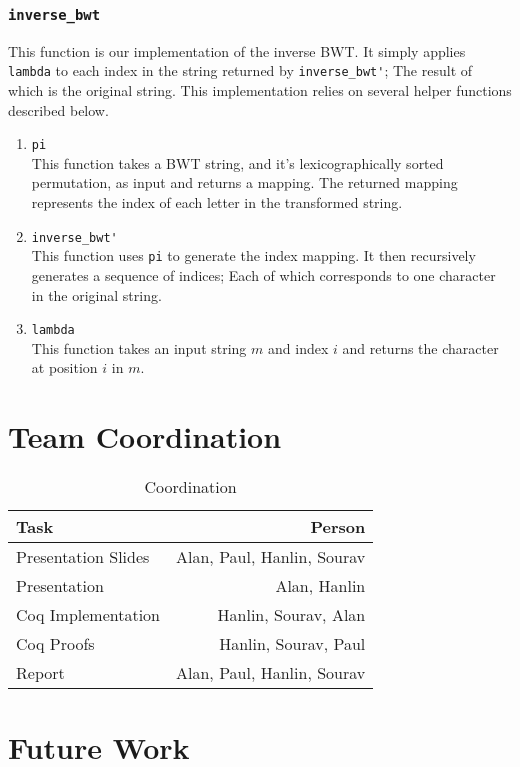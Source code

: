 \documentclass[11pt,letterpaper,]{article}
\begin{document}
\subsubsection{\texttt{inverse\_bwt}}

This function is our implementation of the inverse BWT. It simply applies
\verb|lambda| to each index in the string returned by \verb|inverse_bwt'|; The
result of which is the original string. This implementation relies on several
helper functions described below.

\begin{enumerate}
    \item \verb|pi|\\
        This function takes a BWT string, and it's lexicographically sorted
        permutation, as input and returns a mapping. The returned mapping
        represents the index of each letter in the transformed string.
    \item \verb|inverse_bwt'|\\
        This function uses \verb|pi| to generate the index mapping. It then
        recursively generates a sequence of indices; Each of which corresponds
        to one character in the original string.
    \item \verb|lambda|\\
        This function takes an input string $m$ and index $i$ and returns the
        character at position $i$ in $m$.
\end{enumerate}

\section{Team Coordination}

\begin{table}[H]
\centering
\caption{Coordination}
\begin{tabular}{l|r}
\toprule
Task & Person\\
\midrule
Presentation Slides & Alan, Paul, Hanlin, Sourav\\
Presentation & Alan, Hanlin\\
Coq Implementation & Hanlin, Sourav, Alan\\
Coq Proofs & Hanlin, Sourav, Paul\\
Report & Alan, Paul, Hanlin, Sourav\\
\bottomrule
\end{tabular}
\end{table}

\section{Future Work}
\end{document}
